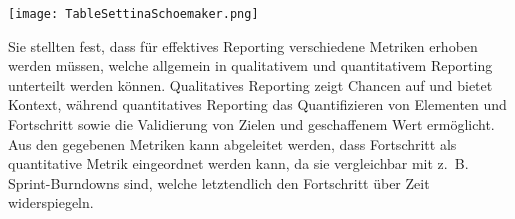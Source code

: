 \vspace{20pt}
\begin{center}
  \begin{minipage}{1\linewidth}
    \texttt{[image: TableSettinaSchoemaker.png]}
  \end{minipage}
\end{center}
\vspace{20pt}


Sie stellten fest, dass für effektives Reporting verschiedene Metriken erhoben werden müssen, welche allgemein in qualitativem und quantitativem Reporting unterteilt werden können.
Qualitatives Reporting zeigt Chancen auf und bietet Kontext, während quantitatives Reporting das Quantifizieren von Elementen und Fortschritt sowie die Validierung von Zielen und geschaffenem Wert ermöglicht.
Aus den gegebenen Metriken kann abgeleitet werden, dass Fortschritt als quantitative Metrik eingeordnet werden kann, da sie vergleichbar mit z. B. Sprint-Burndowns sind, welche letztendlich den Fortschritt über Zeit widerspiegeln.



